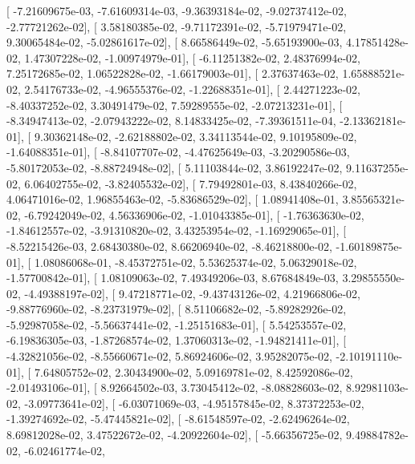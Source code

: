 \documentclass{article}
\begin{document}
       [ -7.21609675e-03,  -7.61609314e-03,  -9.36393184e-02,
         -9.02737412e-02,  -2.77721262e-02],
       [  3.58180385e-02,  -9.71172391e-02,  -5.71979471e-02,
          9.30065484e-02,  -5.02861617e-02],
       [  8.66586449e-02,  -5.65193900e-03,   4.17851428e-02,
          1.47307228e-02,  -1.00974979e-01],
       [ -6.11251382e-02,   2.48376994e-02,   7.25172685e-02,
          1.06522828e-02,  -1.66179003e-01],
       [  2.37637463e-02,   1.65888521e-02,   2.54176733e-02,
         -4.96555376e-02,  -1.22688351e-01],
       [  2.44271223e-02,  -8.40337252e-02,   3.30491479e-02,
          7.59289555e-02,  -2.07213231e-01],
       [ -8.34947413e-02,  -2.07943222e-02,   8.14833425e-02,
         -7.39361511e-04,  -2.13362181e-01],
       [  9.30362148e-02,  -2.62188802e-02,   3.34113544e-02,
          9.10195809e-02,  -1.64088351e-01],
       [ -8.84107707e-02,  -4.47625649e-03,  -3.20290586e-03,
         -5.80172053e-02,  -8.88724948e-02],
       [  5.11103844e-02,   3.86192247e-02,   9.11637255e-02,
          6.06402755e-02,  -3.82405532e-02],
       [  7.79492801e-03,   8.43840266e-02,   4.06471016e-02,
          1.96855463e-02,  -5.83686529e-02],
       [  1.08941408e-01,   3.85565321e-02,  -6.79242049e-02,
          4.56336906e-02,  -1.01043385e-01],
       [ -1.76363630e-02,  -1.84612557e-02,  -3.91310820e-02,
          3.43253954e-02,  -1.16929065e-01],
       [ -8.52215426e-03,   2.68430380e-02,   8.66206940e-02,
         -8.46218800e-02,  -1.60189875e-01],
       [  1.08086068e-01,  -8.45372751e-02,   5.53625374e-02,
          5.06329018e-02,  -1.57700842e-01],
       [  1.08109063e-02,   7.49349206e-03,   8.67684849e-03,
          3.29855550e-02,  -4.49388197e-02],
       [  9.47218771e-02,  -9.43743126e-02,   4.21966806e-02,
         -9.88776960e-02,  -8.23731979e-02],
       [  8.51106682e-02,  -5.89282926e-02,  -5.92987058e-02,
         -5.56637441e-02,  -1.25151683e-01],
       [  5.54253557e-02,  -6.19836305e-03,  -1.87268574e-02,
          1.37060313e-02,  -1.94821411e-01],
       [ -4.32821056e-02,  -8.55660671e-02,   5.86924606e-02,
          3.95282075e-02,  -2.10191110e-01],
       [  7.64805752e-02,   2.30434900e-02,   5.09169781e-02,
          8.42592086e-02,  -2.01493106e-01],
       [  8.92664502e-03,   3.73045412e-02,  -8.08828603e-02,
          8.92981103e-02,  -3.09773641e-02],
       [ -6.03071069e-03,  -4.95157845e-02,   8.37372253e-02,
         -1.39274692e-02,  -5.47445821e-02],
       [ -8.61548597e-02,  -2.62496264e-02,   8.69812028e-02,
          3.47522672e-02,  -4.20922604e-02],
       [ -5.66356725e-02,   9.49884782e-02,  -6.02461774e-02,
\end{document}
